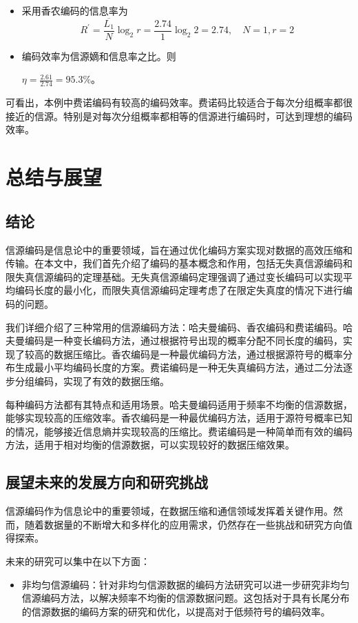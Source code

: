 \begin{multicols}{2}
\begin{itemize}
	\item 采用香农编码的信息率为
	$$R^{\prime}=\frac{\overline{L_1}}{N} \log _2 r=\frac{2.74}{1} \log _2 2=2.74, \quad N=1, r=2 $$
	
	\item 编码效率为信源嫡和信息率之比。则 
	
	$\eta=\frac{2.61}{2.74}=95.3 \%$。
\end{itemize}
可看出，本例中费诺编码有较高的编码效率。费诺码比较适合于每次分组概率都很接近的信源。特别是对每次分组概率都相等的信源进行编码时，可达到理想的编码效率。
\section{总结与展望}
\subsection{结论}

信源编码是信息论中的重要领域，旨在通过优化编码方案实现对数据的高效压缩和传输。在本文中，我们首先介绍了编码的基本概念和作用，包括无失真信源编码和限失真信源编码的定理基础。无失真信源编码定理强调了通过变长编码可以实现平均编码长度的最小化，而限失真信源编码定理考虑了在限定失真度的情况下进行编码的问题。

我们详细介绍了三种常用的信源编码方法：哈夫曼编码、香农编码和费诺编码。哈夫曼编码是一种变长编码方法，通过根据符号出现的概率分配不同长度的编码，实现了较高的数据压缩比。香农编码是一种最优编码方法，通过根据源符号的概率分布生成最小平均编码长度的方案。费诺编码是一种无失真编码方法，通过二分法逐步分组编码，实现了有效的数据压缩。

每种编码方法都有其特点和适用场景。哈夫曼编码适用于频率不均衡的信源数据，能够实现较高的压缩效率。香农编码是一种最优编码方法，适用于源符号概率已知的情况，能够接近信息熵并实现较高的压缩比。费诺编码是一种简单而有效的编码方法，适用于相对均衡的信源数据，可以实现较好的数据压缩效果。

\subsection{展望未来的发展方向和研究挑战}

信源编码作为信息论中的重要领域，在数据压缩和通信领域发挥着关键作用。然而，随着数据量的不断增大和多样化的应用需求，仍然存在一些挑战和研究方向值得探索。

未来的研究可以集中在以下方面：
\begin{itemize}
	\item 非均匀信源编码：针对非均匀信源数据的编码方法研究可以进一步研究非均匀信源编码方法，以解决频率不均衡的信源数据问题。这包括对于具有长尾分布的信源数据的编码方案的研究和优化，以提高对于低频符号的编码效率。
	

\end{itemize}
\end{multicols}
